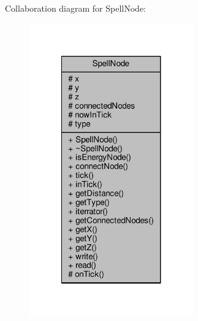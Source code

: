 Collaboration diagram for Spell\-Node\-:
\nopagebreak
\begin{figure}[H]
\begin{center}
\leavevmode
\includegraphics[width=200pt]{class_spell_node__coll__graph}
\end{center}
\end{figure}
